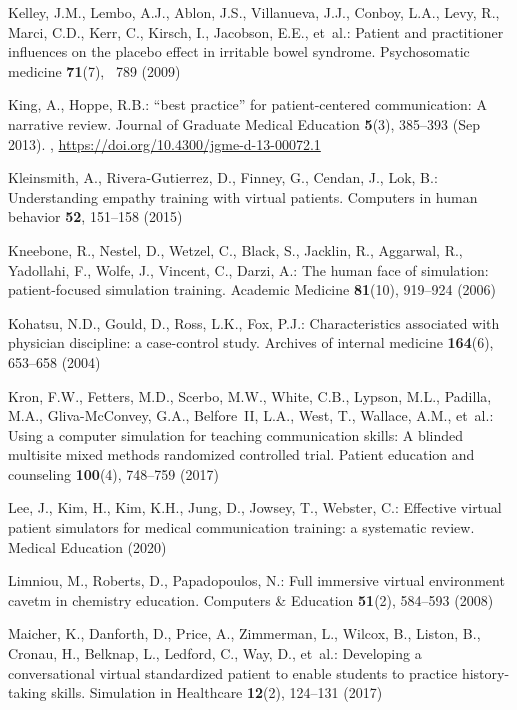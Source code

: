 \documentclass[runningheads]{llncs}
\begin{document}
\begin{thebibliography}{10}
Kelley, J.M., Lembo, A.J., Ablon, J.S., Villanueva, J.J., Conboy, L.A., Levy,
  R., Marci, C.D., Kerr, C., Kirsch, I., Jacobson, E.E., et~al.: Patient and
  practitioner influences on the placebo effect in irritable bowel syndrome.
  Psychosomatic medicine  \textbf{71}(7), ~789 (2009)

King, A., Hoppe, R.B.: {\textquotedblleft}best practice{\textquotedblright} for
  patient-centered communication: A narrative review. Journal of Graduate
  Medical Education  \textbf{5}(3),  385--393 (Sep 2013).
  ,
  \url{https://doi.org/10.4300/jgme-d-13-00072.1}

Kleinsmith, A., Rivera-Gutierrez, D., Finney, G., Cendan, J., Lok, B.:
  Understanding empathy training with virtual patients. Computers in human
  behavior  \textbf{52},  151--158 (2015)

Kneebone, R., Nestel, D., Wetzel, C., Black, S., Jacklin, R., Aggarwal, R.,
  Yadollahi, F., Wolfe, J., Vincent, C., Darzi, A.: The human face of
  simulation: patient-focused simulation training. Academic Medicine
  \textbf{81}(10),  919--924 (2006)

Kohatsu, N.D., Gould, D., Ross, L.K., Fox, P.J.: Characteristics associated
  with physician discipline: a case-control study. Archives of internal
  medicine  \textbf{164}(6),  653--658 (2004)

Kron, F.W., Fetters, M.D., Scerbo, M.W., White, C.B., Lypson, M.L., Padilla,
  M.A., Gliva-McConvey, G.A., Belfore~II, L.A., West, T., Wallace, A.M.,
  et~al.: Using a computer simulation for teaching communication skills: A
  blinded multisite mixed methods randomized controlled trial. Patient
  education and counseling  \textbf{100}(4),  748--759 (2017)

Lee, J., Kim, H., Kim, K.H., Jung, D., Jowsey, T., Webster, C.: Effective
  virtual patient simulators for medical communication training: a systematic
  review. Medical Education  (2020)

Limniou, M., Roberts, D., Papadopoulos, N.: Full immersive virtual environment
  cavetm in chemistry education. Computers \& Education  \textbf{51}(2),
  584--593 (2008)

Maicher, K., Danforth, D., Price, A., Zimmerman, L., Wilcox, B., Liston, B.,
  Cronau, H., Belknap, L., Ledford, C., Way, D., et~al.: Developing a
  conversational virtual standardized patient to enable students to practice
  history-taking skills. Simulation in Healthcare  \textbf{12}(2),  124--131
  (2017)


\end{thebibliography}
\end{document}
